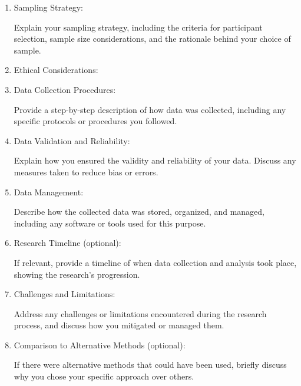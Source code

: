 \begin{enumerate}
 \item Sampling Strategy:
 
	Explain your sampling strategy, including the criteria for participant selection, sample size considerations, and the rationale behind your choice of sample.

\item Ethical Considerations:



\item Data Collection Procedures:

 Provide a step-by-step description of how data was collected, including any specific protocols or procedures you followed.

\item Data Validation and Reliability:

 Explain how you ensured the validity and reliability of your data. Discuss any measures taken to reduce bias or errors.

\item Data Management: 

Describe how the collected data was stored, organized, and managed, including any software or tools used for this purpose.

\item Research Timeline (optional):

 If relevant, provide a timeline of when data collection and analysis took place, showing the research's progression.

\item Challenges and Limitations: 

Address any challenges or limitations encountered during the research process, and discuss how you mitigated or managed them.

\item Comparison to Alternative Methods (optional): 

If there were alternative methods that could have been used, briefly discuss why you chose your specific approach over others.
\end{enumerate}

